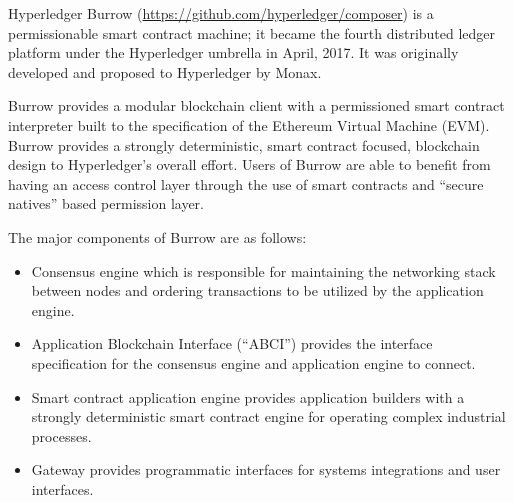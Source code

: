 Hyperledger Burrow (\url{https://github.com/hyperledger/composer}) is a permissionable smart contract machine; it became the fourth distributed ledger platform under the Hyperledger umbrella in April, 2017. It was originally developed and proposed to Hyperledger by Monax.

Burrow provides a modular blockchain client with a permissioned smart contract interpreter built to the specification of the Ethereum Virtual Machine (EVM). Burrow provides a strongly deterministic, smart contract focused, blockchain design to Hyperledger's overall effort. Users of Burrow are able to benefit from having an access control layer through the use of smart contracts and “secure natives” based permission layer.

The major components of Burrow are as follows:
\begin{itemize}
\item Consensus engine which is responsible for maintaining the networking stack between nodes and ordering transactions to be utilized by the application engine.
\item Application Blockchain Interface (“ABCI”) provides the interface specification for the consensus engine and application engine to connect.
\item Smart contract application engine provides application builders with a strongly deterministic smart contract engine for operating complex industrial processes.
\item Gateway provides programmatic interfaces for systems integrations and user interfaces.
\end{itemize}
